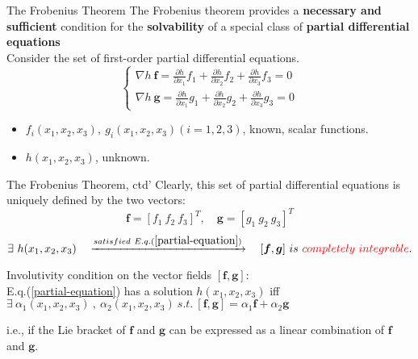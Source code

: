 \documentclass{beamer}
\renewcommand{\vec}[1]{\ensuremath{\boldsymbol{#1}}} %
\begin{document}
\begin{frame}{The Frobenius Theorem}
    The Frobenius theorem provides a \textbf{necessary and sufficient} condition for the \textbf{solvability} of a special class of \textbf{partial differential equations}\\
    Consider the set of first-order partial differential equations.
    \begin{equation}\label{partial-equation}
      \left\{ \begin{array}{c}
                \nabla h~\vec{f}=\frac{\partial h}{\partial x_{1}}f_{1}+\frac{\partial h}{\partial x_{2}}f_{2}+\frac{\partial h}{\partial x_{3}}f_{3}=0 \\
                \nabla h~\vec{g}=\frac{\partial h}{\partial x_{1}}g_{1}+\frac{\partial h}{\partial x_{2}}g_{2}+\frac{\partial h}{\partial x_{3}}g_{3}=0
              \end{array}\right.
    \end{equation}

    \begin{itemize}
      \item $f_{i}(x_{1},x_{2},x_{3}),~g_{i}(x_{1},x_{2},x_{3})(i=1,2,3)$, known, scalar functions.
      \item $h(x_{1},x_{2},x_{3})$, unknown.
    \end{itemize}
\end{frame}


\begin{frame}{The Frobenius Theorem, ctd'}
    Clearly, this set of partial differential equations is uniquely defined by the two vectors:
    $$
    \vec{f}=[f_{1}~f_{2}~f_{3}]^{T},\quad \vec{g}=[g_{1}~g_{2}~g_{3}]^{T}
    $$
    \vspace{-10pt}
    $$
    \exists ~h(x_{1},x_{2},x_{3}) \quad \xrightarrow{satisfied~E.q.(\ref{partial-equation})} \quad [\vec{f}, \vec{g}] ~is ~{\color{red}completely ~integrable}.
    $$

    {\color{red} Involutivity condition} on the vector fields $[\vec{f}, \vec{g}]$:\\
    E.q.(\ref{partial-equation}) has a solution $h(x_{1},x_{2},x_{3})$
    iff
    $\exists ~\alpha_{1}(x_{1},x_{2},x_{3})~,~\alpha_{2}(x_{1},x_{2},x_{3}) ~s.t.~[\vec{f},\vec{g}] = \alpha_{1}\vec{f}+\alpha_{2}\vec{g}$

    i.e., if the Lie bracket of \vec{f} and \vec{g} can be expressed as a linear combination of \vec{f} and \vec{g}.
\end{frame}
\end{document}
